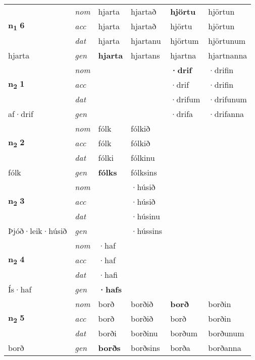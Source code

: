 \begin{longtable}[l]{X>{\footnotesize\itshape}XXXXX}
\multirow{3}{*}{{{\textbf{n{\textsubscript{1}}} \Large{\textbf{6}}}}} & nom & hjarta & hjartað & \textbf{hjörtu} & hjörtun \\*
 & acc & hjarta & hjartað & hjörtu & hjörtun \\*
 & dat & hjarta & hjartanu & hjörtum & hjörtunum \\*
 {\footnotesize{hjarta}} & gen & \textbf{hjarta} & hjartans & hjartna & hjartnanna \\
\midrule

\multirow{3}{*}{{{\textbf{n{\textsubscript{2}}} \Large{\textbf{1}}}}} & nom &  &  & \textbf{·drif} & ·drifin \\*
 & acc &  &  & ·drif & ·drifin \\*
 & dat &  &  & ·drifum & ·drifunum \\*
 {\footnotesize{af\allowbreak ·drif}} & gen & \textbf{} &  & ·drifa & ·drifanna \\
\midrule

\multirow{3}{*}{{{\textbf{n{\textsubscript{2}}} \Large{\textbf{2}}}}} & nom & fólk & fólkið & \textbf{} &  \\*
 & acc & fólk & fólkið &  &  \\*
 & dat & fólki & fólkinu &  &  \\*
 {\footnotesize{fólk}} & gen & \textbf{fólks} & fólksins &  &  \\
\midrule

\multirow{3}{*}{{{\textbf{n{\textsubscript{2}}} \Large{\textbf{3}}}}} & nom &  & ·húsið & \textbf{} &  \\*
 & acc &  & ·húsið &  &  \\*
 & dat &  & ·húsinu &  &  \\*
 {\footnotesize{Þjóð\allowbreak ·leik\allowbreak ·húsið}} & gen & \textbf{} & ·hússins &  &  \\
\midrule

\multirow{3}{*}{{{\textbf{n{\textsubscript{2}}} \Large{\textbf{4}}}}} & nom & ·haf &  & \textbf{} &  \\*
 & acc & ·haf &  &  &  \\*
 & dat & ·hafi &  &  &  \\*
 {\footnotesize{Ís\allowbreak ·haf}} & gen & \textbf{·hafs} &  &  &  \\
\midrule

\multirow{3}{*}{{{\textbf{n{\textsubscript{2}}} \Large{\textbf{5}}}}} & nom & borð & borðið & \textbf{borð} & borðin \\*
 & acc & borð & borðið & borð & borðin \\*
 & dat & borði & borðinu & borðum & borðunum \\*
 {\footnotesize{borð}} & gen & \textbf{borðs} & borðsins & borða & borðanna \\
\midrule


\end{longtable}
